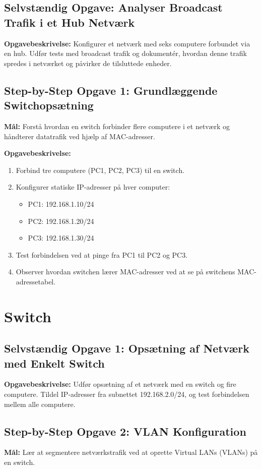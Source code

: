\subsection*{Selvstændig Opgave: Analyser Broadcast Trafik i et Hub Netværk}
\textbf{Opgavebeskrivelse:} Konfigurer et netværk med seks computere forbundet via en hub. Udfør tests med broadcast trafik og dokumentér, hvordan denne trafik spredes i netværket og påvirker de tilsluttede enheder.

\subsection*{Step-by-Step Opgave 1: Grundlæggende Switchopsætning}
\textbf{Mål:} Forstå hvordan en switch forbinder flere computere i et netværk og håndterer datatrafik ved hjælp af MAC-adresser.

\textbf{Opgavebeskrivelse:}
\begin{enumerate}
	\item Forbind tre computere (PC1, PC2, PC3) til en switch.
	\item Konfigurer statiske IP-adresser på hver computer:
	\begin{itemize}
		\item PC1: 192.168.1.10/24
		\item PC2: 192.168.1.20/24
		\item PC3: 192.168.1.30/24
	\end{itemize}
	\item Test forbindelsen ved at pinge fra PC1 til PC2 og PC3.
	\item Observer hvordan switchen lærer MAC-adresser ved at se på switchens MAC-adressetabel.
\end{enumerate}

\section{Switch}
\subsection*{Selvstændig Opgave 1: Opsætning af Netværk med Enkelt Switch}
\textbf{Opgavebeskrivelse:} Udfør opsætning af et netværk med en switch og fire computere. Tildel IP-adresser fra subnettet 192.168.2.0/24, og test forbindelsen mellem alle computere.

\subsection*{Step-by-Step Opgave 2: VLAN Konfiguration}
\textbf{Mål:} Lær at segmentere netværkstrafik ved at oprette Virtual LANs (VLANs) på en switch.

